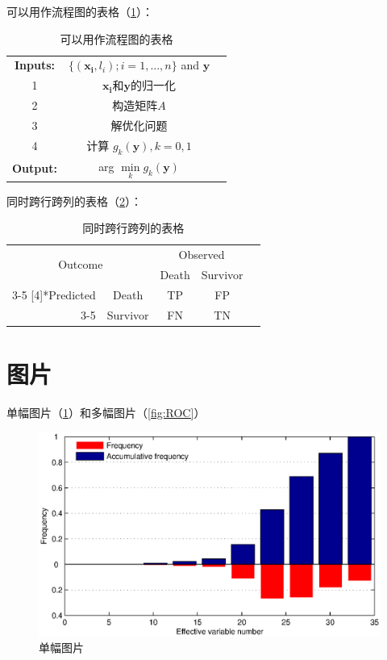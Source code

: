 可以用作流程图的表格（\ref{tab:SpareseRep}）：
\begin{table}
\begin{center}
\begin{tabular}{@{}ccc@{}} \toprule
\bf{Inputs:} \quad  & $ \{(\mathbf{x_i},l_i);i=1,...,n \} $ and $\mathbf{y} $ \\
1 & $\mathbf{x_i}$和$\mathbf{y}$的归一化  \\
2 & 构造矩阵$A$  \\
3 & 解优化问题\\
4 &	计算 $g_k(\mathbf{y}),k=0,1$	\\
\bf{Output:} \quad & arg $\mathop{\mathrm{min}}\limits_{k} g_k(\mathbf{y}) $\\
\bottomrule
\end{tabular}
\end{center}
\caption{可以用作流程图的表格}
\label{tab:SpareseRep}
\end{table}

同时跨行跨列的表格（\ref{tab:confusionmatrix}）：
\begin{table}[htbp]
\centering
\begin{tabular}{rcccc}
    \toprule
    \multicolumn{2}{c}{\multirow{2}[2]{*}{Outcome}} & \multicolumn{2}{c}{Observed} & \\
    \multicolumn{2}{c}{} & Death  & Survivor \\
    \cline{3-5}
    \multirow{2}[4]{*}{Predicted} & Death & TP   & FP \\
    \cline{3-5}
          & Survivor & FN   & TN \\
   \bottomrule
\end{tabular}
\caption{同时跨行跨列的表格}
\label{tab:confusionmatrix}
\end{table}


\section{图片}
单幅图片（\ref{fig:histogram}）和多幅图片（\ref{fig:ROC}）
\begin{figure}[htbp]
\begin{center}
	\includegraphics[width=0.8\linewidth]{histogram.eps}
\end{center}
\caption{单幅图片}
\label{fig:histogram}
\end{figure}

